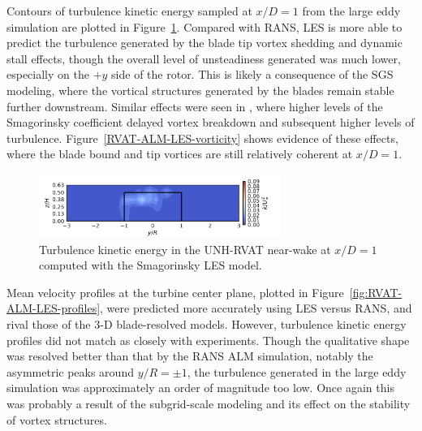 \documentclass[times]{weauth}
\begin{document}
Contours of turbulence kinetic energy sampled at $x/D=1$ from the large eddy
simulation are plotted in Figure~\ref{fig:RVAT-ALM-LES-kcont}. Compared with
RANS, LES is more able to predict the turbulence generated by the blade tip
vortex shedding and dynamic stall effects, though the overall level of
unsteadiness generated was much lower, especially on the $+y$ side of the rotor.
This is likely a consequence of the SGS modeling, where the vortical structures
generated by the blades remain stable further downstream. Similar effects were
seen in \cite{Martinez-Tossas2015a, Shamsoddin2014}, where higher levels of the
Smagorinsky coefficient delayed vortex breakdown and subsequent higher levels of
turbulence. Figure~\ref{RVAT-ALM-LES-vorticity} shows evidence of these effects,
where the blade bound and tip vortices are still relatively coherent at $x/D=1$.

\begin{figure}
    \centering

    \includegraphics[width=0.7\textwidth]{RVAT-ALM-LES_kcont}

    \caption{Turbulence kinetic energy in the UNH-RVAT near-wake at $x/D=1$
        computed with the Smagorinsky LES model.}

    \label{fig:RVAT-ALM-LES-kcont}
\end{figure}

Mean velocity profiles at the turbine center plane, plotted in
Figure~\ref{fig:RVAT-ALM-LES-profiles}, were predicted more accurately using LES
versus RANS, and rival those of the 3-D blade-resolved models. However,
turbulence kinetic energy profiles did not match as closely with experiments.
Though the qualitative shape was resolved better than that by the RANS ALM
simulation, notably the asymmetric peaks around $y/R = \pm 1$, the turbulence
generated in the large eddy simulation was approximately an order of magnitude
too low. Once again this was probably a result of the subgrid-scale modeling and
its effect on the stability of vortex structures.
\end{document}
